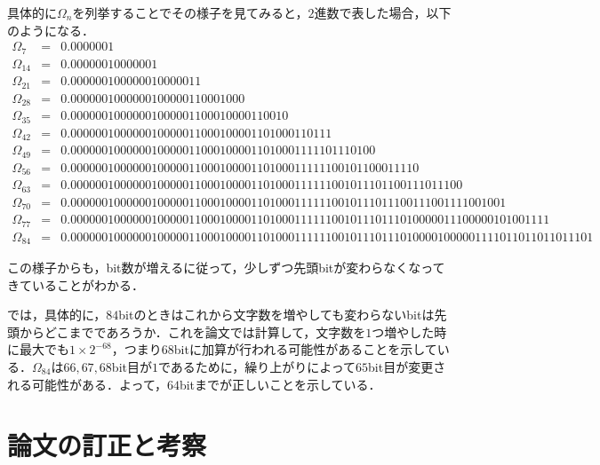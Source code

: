 \documentclass{jarticle}
\begin{document}
具体的に$\Omega_n$を列挙することでその様子を見てみると，$2$進数で表した場合，以下のようになる．
\begin{eqnarray}
	\Omega_7 &=& 0.0000001\\
	\Omega_{14} &=& 0.0000001 0000001\\
	\Omega_{21} &=& 0.0000001 0000001 0000011\\
	\Omega_{28} &=& 0.0000001 0000001 0000011 0001000\\
	\Omega_{35} &=& 0.0000001 0000001 0000011 0001000 0110010\\
	\Omega_{42} &=& 0.0000001 0000001 0000011 0001000 0110100 0110111\\
	\Omega_{49} &=& 0.0000001 0000001 0000011 0001000 0110100 0111110 1110100\\
	\Omega_{56} &=& 0.0000001 0000001 0000011 0001000 0110100 0111111 0010110 0011110\\
	\Omega_{63} &=& 0.0000001 0000001 0000011 0001000 0110100 0111111 0010111 0110011 1011100\\
	\Omega_{70} &=& 0.0000001 0000001 0000011 0001000 0110100 0111111 0010111 0111001 1100111 1001001\\
	\Omega_{77} &=& 0.0000001 0000001 0000011 0001000 0110100 0111111 0010111 0111010 0000111 0000010 1001111\\
	\Omega_{84} &=& 0.0000001 0000001 0000011 0001000 0110100 0111111 0010111 0111010 0001000 0011110 1101101 1011101
\end{eqnarray}

この様子からも，bit数が増えるに従って，少しずつ先頭bitが変わらなくなってきていることがわかる．

では，具体的に，$84$bitのときはこれから文字数を増やしても変わらないbitは先頭からどこまでであろうか．これを論文では計算して，文字数を$1$つ増やした時に最大でも$1\times2^{-68}$，つまり$68$bitに加算が行われる可能性があることを示している．$\Omega_{84}$は$66,67,68$bit目が$1$であるために，繰り上がりによって$65$bit目が変更される可能性がある．よって，$64$bitまでが正しいことを示している．





\section{論文の訂正と考察}
\end{document}
